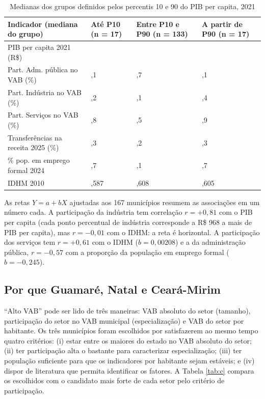 \documentclass[12pt,a4paper]{article}
\newcommand{\fonte}[1]{\par\vspace{2pt}{\centering\small #1\par}\vspace{2pt}}
\begin{document}
\begin{table}[!htb]
\centering
\caption{Medianas dos grupos definidos pelos percentis 10 e 90 do PIB per capita, 2021}
\label{tab:p}
\footnotesize
\begin{tabular}{@{}p{6.2cm}>{\centering\arraybackslash}p{2.4cm}>{\centering\arraybackslash}p{2.9cm}>{\centering\arraybackslash}p{2.6cm}@{}}
\toprule
Indicador (mediana do grupo) & Até P10 \newline (n = 17) & Entre P10 e P90 \newline (n = 133) & A partir de P90 \newline (n = 17) \\
\midrule
PIB per capita 2021 (R\$) & 9.545 & 13.469 & 47.183 \\
Part. Adm. pública no VAB (\%) & 67,1 & 51,7 & 17,1 \\
Part. Indústria no VAB (\%) & 4,2 & 5,1 & 59,4 \\
Part. Serviços no VAB (\%) & 22,8 & 27,5 & 13,9 \\
Transferências na receita 2025 (\%) & 93,3 & 91,2 & 89,3 \\
\% pop. em emprego formal 2024 & 6,7 & 11,1 & 17,7 \\
IDHM 2010 & 0,587 & 0,608 & 0,605 \\
\bottomrule
\end{tabular}
\fonte{Fonte: elaborada pelo autor (2026) com dados do IBGE (2023), IBGE Cidades e CEMPRE.}
\end{table}

As retas $Y = a + bX$ ajustadas aos 167 municípios resumem as associações em um número cada. A participação da indústria tem correlação $r = +0{,}81$ com o PIB per capita (cada ponto percentual de indústria corresponde a R\$ 968 a mais de PIB per capita), mas $r = -0{,}01$ com o IDHM: a reta é horizontal. A participação dos serviços tem $r = +0{,}61$ com o IDHM ($b = 0{,}00208$) e a da administração pública, $r = -0{,}57$ com a proporção da população em emprego formal ($b = -0{,}245$).

\subsection{Por que Guamaré, Natal e Ceará-Mirim}

``Alto VAB'' pode ser lido de três maneiras: VAB absoluto do setor (tamanho), participação do setor no VAB municipal (especialização) e VAB do setor por habitante. Os três municípios foram escolhidos por satisfazerem ao mesmo tempo quatro critérios: (i) estar entre os maiores do estado no VAB absoluto do setor; (ii) ter participação alta o bastante para caracterizar especialização; (iii) ter população suficiente para que os indicadores por habitante sejam estáveis; e (iv) dispor de literatura que permita identificar os fatores. A Tabela \ref{tab:c} compara os escolhidos com o candidato mais forte de cada setor pelo critério de participação.
\end{document}
